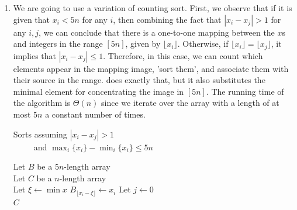   \begin{enumerate}
    \item  We are going to use a variation of counting sort. First, we observe that if it is given that $x_{i} < 5n$ for any $i$, then combining the fact that $|x_{i} - x_{j}| > 1$ for any $i,j$, we can conclude that there is a one-to-one mapping between the $x$s and integers in the range $[5n]$, given by $\lfloor x_{i} \rfloor$. Otherwise, if $\lfloor x_{i} \rfloor = \lfloor x_{j} \rfloor$, it implies that $|x_{i} - x_{j}| \le 1$. Therefore, in this case, we can count which elements appear in the mapping image, 'sort them', and associate them with their source in the range.  does exactly that, but it also substitutes the minimal element for concentrating the image in $[5n]$. The running time of the algorithm is $\Theta(n)$ since we iterate over the array with a length of at most $5n$ a constant number of times.

      \begin{algorithm}[H]
     \caption{ Sorts assuming $|x_{i} - x_{j}| > 1$ \\ \ \ \ \ \ and $ \max_{i} \{x_{i}\} -\min_{i} \{x_{i}\} \leq 5n$ } \label{alg:auss1}
     Let $B$ be a $5n$-length array\\
     Let $C$ be a $n$-length array\\
     Let $\xi \leftarrow \min x$
      {
       $B_{\lfloor x_{i} - \xi   \rfloor } \leftarrow x_{i}$
     }
     Let $j \leftarrow 0$ \\
      {
     }
    \Return $C$
\end{algorithm}
\ifdefined\CHECK

\end{enumerate}
